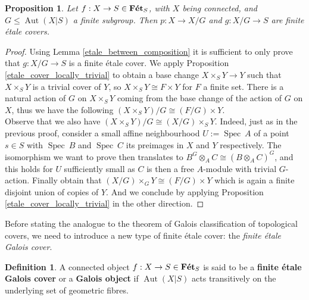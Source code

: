 \documentclass{article}
\theoremstyle{plain}
\newtheorem{proposition}[theorem]{Proposition}
\theoremstyle{definition}
\newtheorem{definition}[theorem]{Definition}
\DeclareMathOperator{\Aut}{Aut}
\DeclareMathOperator{\Spec}{Spec}
\DeclareMathOperator{\Fet}{\bf{F\acute{e}t}}
\begin{document}
\begin{proposition}
\label{quotient_finite_etale_cover}
    Let $f: X\rightarrow S \in \Fet_S$, with $X$ being connected, and $G\leq \Aut(X|S)$ a finite subgroup. 
    Then $p:X\rightarrow X/G$ and $g:X/G \rightarrow S$ are finite \'etale covers.
\end{proposition}
\begin{proof}
    Using Lemma \ref{etale_between_composition} it is sufficient to only prove that $g:X/G\rightarrow S$ is a finite \'etale cover.
    We apply Proposition \ref{etale_cover_locally_trivial} to obtain a base change $X\times_SY\rightarrow Y$ such that $X\times_SY$ is a trivial cover of $Y$, so $X\times_SY\cong F\times Y$ for $F$ a finite set.
    There is a natural action of $G$ on $X\times_SY$ coming from the base change of the action of $G$ on $X$, thus we have the following $(X\times_SY)/G\cong (F/G)\times Y$.\\ 
    Observe that we also have $(X\times_SY)/G\cong (X/G)\times_SY$. 
    Indeed, just as in the previous proof, consider a small affine neighbourhood $U:=\Spec\:A$ of a point $s\in S$ with $\Spec\:B$ and $\Spec\:C$ its preimages in $X$ and $Y$ respectively. 
    The isomorphism we want to prove then translates to $B^G\otimes_AC \cong (B\otimes_AC)^G$, and this holds for $U$ sufficiently small as $C$ is then a free $A$-module with trivial $G$-action.
    Finally obtain that $(X/G)\times_G Y \cong (F/G)\times Y$ which is again a finite disjoint union of copies of $Y$. And we conclude by applying Proposition \ref{etale_cover_locally_trivial} in the other direction.
\end{proof}


\noindent Before stating the analogue to the theorem of Galois classification of topological covers, we need to introduce a new type of finite \'etale cover: the \textit{finite \'etale Galois cover}.
\begin{definition}
    A connected object $f:X\rightarrow S \in \Fet_S$ is said to be a \textbf{finite \'etale Galois cover} or a \textbf{Galois object} if $\Aut(X|S)$ acts transitively on the underlying set of geometric fibres.
\end{definition}
\end{document}
